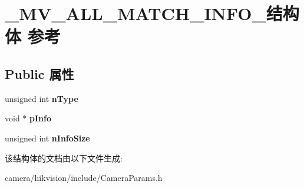 \hypertarget{struct___m_v___a_l_l___m_a_t_c_h___i_n_f_o__}{}\section{\+\_\+\+M\+V\+\_\+\+A\+L\+L\+\_\+\+M\+A\+T\+C\+H\+\_\+\+I\+N\+F\+O\+\_\+结构体 参考}
\label{struct___m_v___a_l_l___m_a_t_c_h___i_n_f_o__}
\subsection*{Public 属性}
\begin{DoxyCompactItemize}
\item 
\mbox{\label{struct___m_v___a_l_l___m_a_t_c_h___i_n_f_o___a27039421eb5c83c9d6a0382abfb08b7e}} 
unsigned int {\bfseries n\+Type}
\item 
\mbox{\label{struct___m_v___a_l_l___m_a_t_c_h___i_n_f_o___ada17fb4ac2a88aba05c4742ef6a13071}} 
void $\ast$ {\bfseries p\+Info}
\item 
\mbox{\label{struct___m_v___a_l_l___m_a_t_c_h___i_n_f_o___a16de9f1db509067d0dde2c182bfe446d}} 
unsigned int {\bfseries n\+Info\+Size}
\end{DoxyCompactItemize}


该结构体的文档由以下文件生成\+:\begin{DoxyCompactItemize}
\item 
camera/hikvision/include/Camera\+Params.\+h\end{DoxyCompactItemize}
